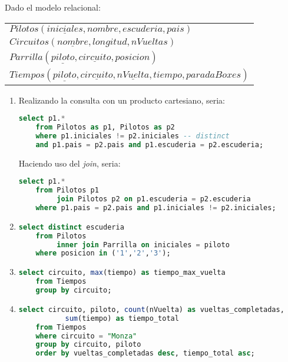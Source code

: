 Dado el modelo relacional:
\begin{center}
	\begin{tabular}{l}
		$Pilotos(\underline{iniciales}, nombre, escuderia, pais)$\\
		$Circuitos(\underline{nombre}, longitud, nVueltas)$\\
		$Parrilla(\underline{piloto}, \underline{circuito}, posicion)$\\				$Tiempos(\underline{piloto}, \underline{circuito}, \underline{nVuelta}, tiempo, paradaBoxes)$\\
	\end{tabular}
\end{center}

\begin{enumerate}

	\item 
	Realizando la consulta con un producto cartesiano, seria:
	\begin{lstlisting}[language=sql]
	select p1.*
	from Pilotos as p1, Pilotos as p2
	where p1.iniciales != p2.iniciales -- distinct
	and p1.pais = p2.pais and p1.escuderia = p2.escuderia;\end{lstlisting}
	
	Haciendo uso del \textit{join}, seria:
	\begin{lstlisting}[language=sql]
	select p1.*
	from Pilotos p1 
	     join Pilotos p2 on p1.escuderia = p2.escuderia
	where p1.pais = p2.pais and p1.iniciales != p2.iniciales;\end{lstlisting}
	
	\item 
	\begin{lstlisting}[language=sql]
	select distinct escuderia
	from Pilotos 
	     inner join Parrilla on iniciales = piloto
	where posicion in ('1','2','3');\end{lstlisting}
	
	\item 
	\begin{lstlisting}[language=sql]
	select circuito, max(tiempo) as tiempo_max_vuelta
	from Tiempos
	group by circuito;\end{lstlisting}

	\newpage
	\item 
	\begin{lstlisting}[language=sql]
	select circuito, piloto, count(nVuelta) as vueltas_completadas, 
	       sum(tiempo) as tiempo_total
	from Tiempos
	where circuito = "Monza"
	group by circuito, piloto
	order by vueltas_completadas desc, tiempo_total asc;\end{lstlisting}
	

\end{enumerate}
